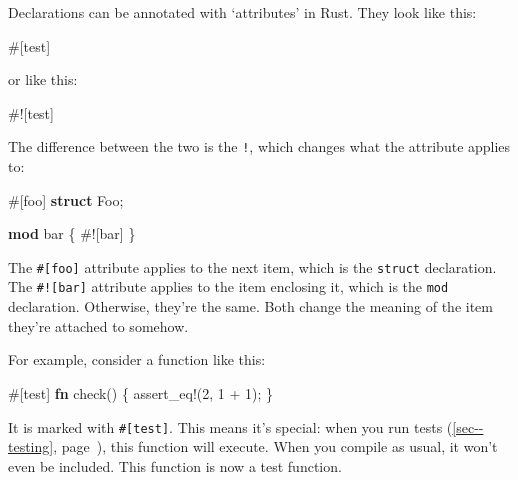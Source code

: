 \documentclass[a4paper,]{book}
\renewcommand*{\hyperref}[2][\ar]{%
  \def\ar{#2}%
  #2 (\autoref{#1}, page~\pageref{#1})}
\newenvironment{Shaded}{\begin{snugshade}}{\end{snugshade}}
\newcommand{\KeywordTok}[1]{\textcolor[rgb]{0.13,0.29,0.53}{\textbf{{#1}}}}
\newcommand{\DecValTok}[1]{\textcolor[rgb]{0.00,0.00,0.81}{{#1}}}
\newcommand{\OtherTok}[1]{\textcolor[rgb]{0.56,0.35,0.01}{{#1}}}
\newcommand{\NormalTok}[1]{{#1}}
\begin{document}

Declarations can be annotated with `attributes' in Rust. They look like
this:

\begin{Shaded}
\begin{Highlighting}[]
\OtherTok{#[}\NormalTok{test}\OtherTok{]}
\end{Highlighting}
\end{Shaded}

or like this:

\begin{Shaded}
\begin{Highlighting}[]
\NormalTok{#![test]}
\end{Highlighting}
\end{Shaded}

The difference between the two is the \texttt{!}, which changes what the
attribute applies to:

\begin{Shaded}
\begin{Highlighting}[]
\OtherTok{#[}\NormalTok{foo}\OtherTok{]}
\KeywordTok{struct} \NormalTok{Foo;}

\KeywordTok{mod} \NormalTok{bar \{}
    \NormalTok{#![bar]}
\NormalTok{\}}
\end{Highlighting}
\end{Shaded}

The \texttt{\#{[}foo{]}} attribute applies to the next item, which is
the \texttt{struct} declaration. The \texttt{\#!{[}bar{]}} attribute
applies to the item enclosing it, which is the \texttt{mod} declaration.
Otherwise, they're the same. Both change the meaning of the item they're
attached to somehow.

For example, consider a function like this:

\begin{Shaded}
\begin{Highlighting}[]
\OtherTok{#[}\NormalTok{test}\OtherTok{]}
\KeywordTok{fn} \NormalTok{check() \{}
    \OtherTok{assert_eq!}\NormalTok{(}\DecValTok{2}\NormalTok{, }\DecValTok{1} \NormalTok{+ }\DecValTok{1}\NormalTok{);}
\NormalTok{\}}
\end{Highlighting}
\end{Shaded}

It is marked with \texttt{\#{[}test{]}}. This means it's special: when
you run \hyperref[sec--testing]{tests}, this function will execute. When
you compile as usual, it won't even be included. This function is now a
test function.
\end{document}
